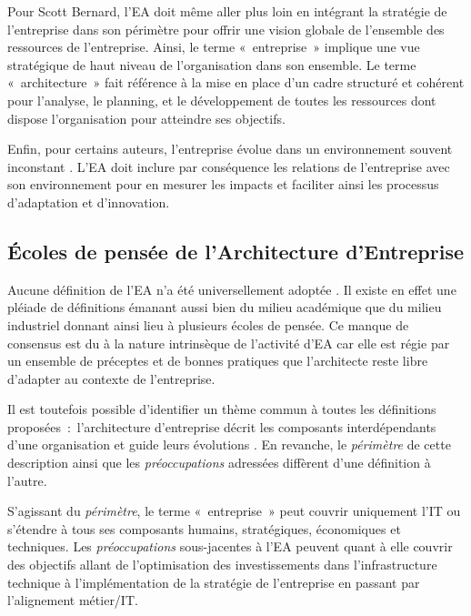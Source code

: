 Pour Scott Bernard, l'EA doit même aller plus loin en intégrant la stratégie de 
l'entreprise \cite{bernard2012introduction} dans son périmètre pour 
offrir une vision globale de l'ensemble des ressources de l'entreprise. Ainsi, le terme «~entreprise~» implique une vue stratégique de 
haut niveau de l'organisation dans son ensemble. Le terme 
«~architecture~» fait référence à la mise en place d'un cadre structuré et cohérent pour l'analyse, le planning, et le développement de toutes les ressources dont dispose l'organisation pour atteindre ses objectifs. 

Enfin, pour certains auteurs, l'entreprise évolue dans un environnement souvent inconstant \cite{lapalme2012three}. L'EA doit inclure par conséquence les relations de l'entreprise avec son environnement pour en mesurer les impacts et faciliter ainsi les processus d'adaptation et d'innovation.


	\subsection{Écoles de pensée de l'Architecture d'Entreprise} 

Aucune définition de l'EA n'a été universellement adoptée \cite{mentz2012comparison} \cite{ranganathan2005enterprise}. Il existe en effet une pléiade de définitions émanant aussi bien du milieu académique que du milieu industriel donnant ainsi lieu à plusieurs écoles de pensée. Ce manque de consensus est du à la nature intrinsèque de l'activité d'EA car elle est régie par un ensemble de préceptes et de bonnes pratiques que l'architecte reste libre d'adapter au contexte de l'entreprise. 

Il est toutefois possible d'identifier un thème commun à toutes les définitions 
proposées~:~l'architecture d'entreprise décrit les composants interdépendants 
d'une organisation et guide leurs évolutions \cite{lapalme2012three}. En 
revanche, le \textit{périmètre} de cette description ainsi que les \textit{préoccupations} adressées diffèrent d'une définition à l'autre.

S'agissant du \textit{périmètre}, le terme «~entreprise~» peut couvrir uniquement l'IT  ou s'étendre à tous ses composants humains, stratégiques, économiques et techniques. Les \textit{préoccupations} sous-jacentes à l'EA peuvent quant à elle couvrir des objectifs allant de l'optimisation des investissements dans l'infrastructure technique à l'implémentation de la stratégie de l'entreprise en passant par l'alignement métier/IT. 

